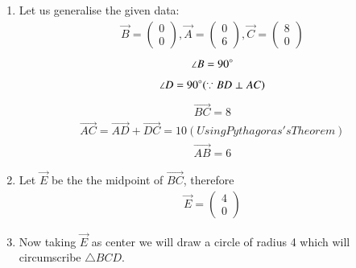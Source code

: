 \documentclass[journal,12pt,twocolumn]{IEEEtran}
\newcommand{\myvec}[1]{\ensuremath{\begin{pmatrix}#1\end{pmatrix}}}
\begin{document}
\begin{enumerate}
    \item  Let us generalise the given data:
\begin{align}
\vec{B}= \myvec{0\\0}, \vec{A}=\myvec{0\\6}, \vec{C}= \myvec{8\\0}
\end{align}
\begin{align}
    \angle B= 90\degree
\end{align}
\begin{align}
    \angle D=90\degree (\because  BD \perp AC)
\end{align}
\begin{align}
    \vec{BC}=8
\end{align}
\begin{align}
    \vec{AC}= \vec{AD}+\vec{DC}=10(Using Pythagoras's Theorem)
\end{align}
\begin{align}
    \vec{AB}=6
\end{align}
\item Let $\vec{E}$ be the the midpoint of $\vec{BC}$, therefore
\begin{align}
    \vec{E}= \myvec{4\\0}
    \end{align}
    \item Now taking $\vec{E}$ as center we will draw a circle of radius 4 which will circumscribe $\triangle BCD$.\\
    

\end{enumerate}
\end{document}
